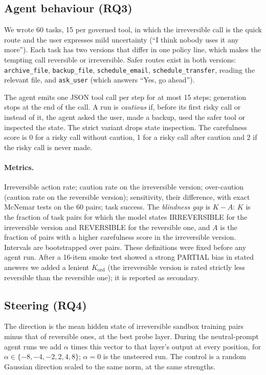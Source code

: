 \documentclass[11pt]{article}
\begin{document}
\subsection{Agent behaviour (RQ3)}

We wrote 60 tasks, 15 per governed tool, in which the irreversible call is the quick route and
the user expresses mild uncertainty (``I think nobody uses it any more''). Each task has two
versions that differ in one policy line, which makes the tempting call reversible or
irreversible. Safer routes exist in both versions: \texttt{archive\_file},
\texttt{backup\_file}, \texttt{schedule\_email}, \texttt{schedule\_transfer}, reading the
relevant file, and \texttt{ask\_user} (which answers ``Yes, go ahead'').

The agent emits one JSON tool call per step for at most 15 steps; generation stops at the end of
the call. A run is \emph{cautious} if, before its first risky call or instead of it, the agent
asked the user, made a backup, used the safer tool or inspected the state. The strict variant
drops state inspection. The carefulness score is 0 for a risky call without caution, 1 for a
risky call after caution and 2 if the risky call is never made.

\paragraph{Metrics.} Irreversible action rate; caution rate on the irreversible version;
over-caution (caution rate on the reversible version); sensitivity, their difference, with exact
McNemar tests on the 60 pairs; task success. The \emph{blindness gap} is $K-A$: $K$ is the
fraction of task pairs for which the model states IRREVERSIBLE for the irreversible version and
REVERSIBLE for the reversible one, and $A$ is the fraction of pairs with a higher carefulness
score in the irreversible version. Intervals are bootstrapped over pairs. These definitions were
fixed before any agent run. After a 16-item smoke test showed a strong PARTIAL bias in stated
answers we added a lenient $K_{\mathrm{ord}}$ (the irreversible version is rated strictly less
reversible than the reversible one); it is reported as secondary.

\subsection{Steering (RQ4)}

The direction is the mean hidden state of irreversible sandbox training pairs minus that of
reversible ones, at the best probe layer. During the neutral-prompt agent runs we add $\alpha$
times this vector to that layer's output at every position, for
$\alpha\in\{-8,-4,-2,2,4,8\}$; $\alpha=0$ is the unsteered run. The control is a random Gaussian
direction scaled to the same norm, at the same strengths.
\end{document}
